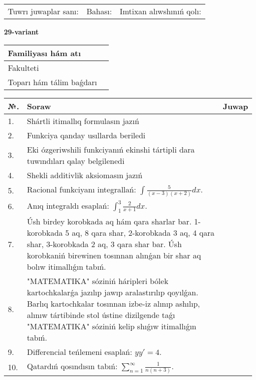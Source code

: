 \documentclass{article}
\begin{document}
\vspace{1cm}

\begin{tabular}{ c c c }
Tuwrı juwaplar sanı: \underline{\hspace{2cm}} & Bahası: \underline{\hspace{2cm}} & Imtixan alıwshınıń qolı: \underline{\hspace{2cm}} \\
\end{tabular}

\newpage

\begin{center}\textbf{29-variant}\end{center}

\bgroup
\def\arraystretch{1.5}
\begin{tabular}{ |m{6cm}|m{10cm}| }
  \hline
  Familiyası hám atı & \\
  \hline
  Fakulteti &\\
  \hline
  Toparı hám tálim baǵdarı & \\
  \hline
\end{tabular}
\egroup

\vspace{0.5cm}

\bgroup
\def\arraystretch{2}
\begin{tabular}{ |l|m{8cm}|m{7cm}| }
  \hline
  №. & Soraw & Juwap \\
  \hline
  1. & Shártli itimallıq formulasın jazıń &  \\
  \hline
  2. & Funkciya qanday usıllarda beriledi &  \\
  \hline
  3. & Eki ózgeriwshili funkciyanıń ekinshi tártipli dara tuwındıları qalay belgilenedi &  \\
  \hline
  4. & Shekli additivlik aksiomasın jazıń &  \\
  \hline
  5. & Racional funkciyanı integrallań: $\displaystyle\int {\frac{5}{(x - 3)(x + 2)}dx}$. &  \\
  \hline
  6. & Anıq integraldı esaplań: $\displaystyle\int_{1}^{3}{\frac{2}{x + 1}dx}$. &  \\
  \hline
  7. & Úsh birdey korobkada aq hám qara sharlar bar. 1-korobkada 5 aq, 8 qara shar, 2-korobkada 3 aq, 4 qara shar, 3-korobkada 2 aq, 3 qara shar bar. Úsh korobkaniń birewinen tosınnan alınǵan bir shar aq bolıw itimallıǵın tabıń. &  \\
  \hline
  8. & "MATEMATIKA" sóziniń háripleri bólek kartochkalarǵa jazılıp jawıp aralastırılıp qoyılǵan. Barlıq kartochkalar tosınnan izbe-iz alınıp ashılıp, alınıw tártibinde stol ústine dizilgende taǵı "MATEMATIKA" sóziniń kelip shıǵıw itimallıǵın tabıń. &  \\
  \hline
  9. & Differencial teńlemeni esaplań: $yy'= 4$. &  \\
  \hline
  10. & Qatardıń qosındısın tabıń: $\displaystyle\sum_{n = 1}^{\infty}\frac{1}{n(n + 3)}$. &  \\
  \hline
\end{tabular}
\egroup
\end{document}
